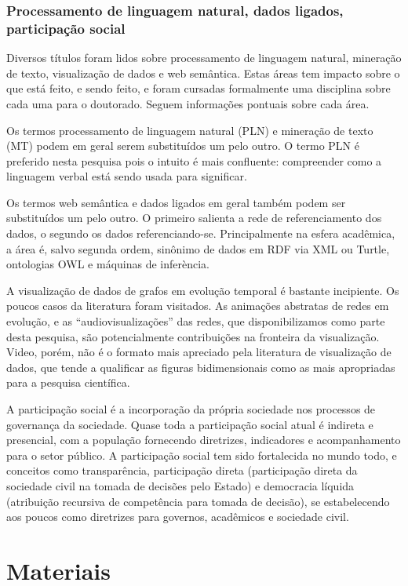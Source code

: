 \documentclass[a4paper,openright,12pt]{report} %
\begin{document}
\subsection{Processamento de linguagem natural, dados ligados, participação social}\label{sec:misc}
Diversos títulos foram lidos sobre processamento de linguagem natural, mineração de texto,
visualização de dados e web semântica. Estas áreas tem impacto sobre o que está feito, e sendo feito,
e foram cursadas formalmente uma disciplina sobre cada uma para o doutorado.
Seguem informações pontuais sobre cada área.

Os termos processamento de linguagem natural (PLN) e mineração de
texto (MT) podem em geral serem substituídos um pelo outro.
O termo PLN é preferido nesta pesquisa pois o intuito é mais confluente: 
compreender como a linguagem verbal está
sendo usada para significar.

Os termos web semântica e dados ligados em geral também podem ser 
substituídos um pelo outro. O primeiro salienta
a rede de referenciamento dos dados,
o segundo os dados referenciando-se. Principalmente na esfera
acadêmica, a área é, salvo segunda ordem, sinônimo de dados em 
RDF via XML ou Turtle, ontologias OWL e máquinas de inferència.

A visualização de dados de grafos em evolução temporal é bastante
incipiente. Os poucos casos da literatura foram visitados. As
animações abstratas de redes em evolução, e as ``audiovisualizações''
das redes, que disponibilizamos como parte desta pesquisa,
são potencialmente contribuições na fronteira da visualização.
Video, porém, não é o formato mais apreciado pela literatura
de visualização de dados, que tende a qualificar as figuras
bidimensionais como as mais apropriadas para a pesquisa
científica.

A participação social é a incorporação da própria sociedade nos 
processos de governança da sociedade.
Quase toda a participação social atual é indireta e presencial, 
com a população fornecendo diretrizes, indicadores e acompanhamento
para o setor público.
A participação social tem sido fortalecida no mundo todo,
e conceitos como transparência, participação direta (participação direta 
da sociedade civil na tomada de decisões pelo Estado) e
democracia líquida (atribuição recursiva de competência para tomada
de decisão), se estabelecendo aos poucos como diretrizes para
governos, acadêmicos e sociedade civil.

\chapter{Materiais}\label{sec:mat}
\end{document}
